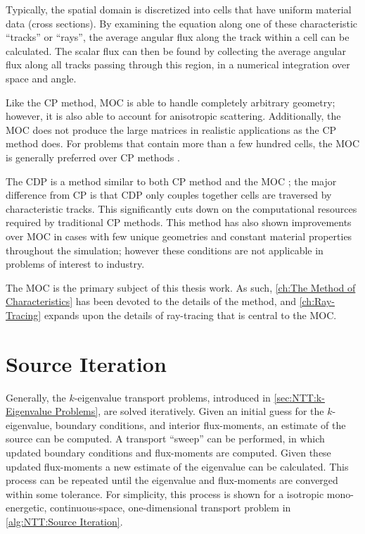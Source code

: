 {{{{                Typically, the spatial domain is discretized into cells that have uniform material data (cross sections).
                By examining the equation along one of these characteristic ``tracks'' or ``rays'', the average angular flux along the track within a cell can be calculated.
                The scalar flux can then be found by collecting the average angular flux along all tracks passing through this region, in a numerical integration over space and angle.

                Like the \ac{CP} method, \ac{MOC} is able to handle completely arbitrary geometry; however, it is also able to account for anisotropic scattering.
                Additionally, the \ac{MOC} does not produce the large matrices in realistic applications as the \ac{CP} method does.
                For problems that contain more than a few hundred cells, the \ac{MOC} is generally preferred over \ac{CP} methods \cite{Hebert2010}.

                The \ac{CDP} is a method similar to both \ac{CP} method and the \ac{MOC} \cite{Hong1999,Liu2014}; the major difference from \ac{CP} is that \ac{CDP} only couples together cells are traversed by characteristic tracks.
                This significantly cuts down on the computational resources required by traditional \ac{CP} methods.
                This method has also shown improvements over \ac{MOC} in cases with few unique geometries and constant material properties throughout the simulation; however these conditions are not applicable in problems of interest to industry.

                The \ac{MOC} is the primary subject of this thesis work.
                As such, \cref{ch:The Method of Characteristics} has been devoted to the details of the method, and \cref{ch:Ray-Tracing} expands upon the details of ray-tracing that is central to the \ac{MOC}.
            }
        }
    }
    \section{Source Iteration}{\label{sec:NTT:Source Iteration}
        Generally, the $k$-eigenvalue transport problems, introduced in \cref{sec:NTT:k-Eigenvalue Problems}, are solved iteratively.
        Given an initial guess for the $k$-eigenvalue, boundary conditions, and interior flux-moments, an estimate of the source can be computed.
        A transport ``sweep'' can be performed, in which updated boundary conditions and flux-moments are computed.
        Given these updated flux-moments a new estimate of the eigenvalue can be calculated.
        This process can be repeated until the eigenvalue and flux-moments are converged within some tolerance.
        For simplicity, this process is shown for a isotropic mono-energetic, continuous-space, one-dimensional transport problem in \cref{alg:NTT:Source Iteration}.

}}
